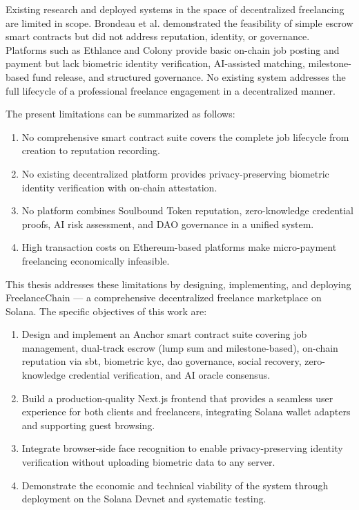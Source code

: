 Existing research and deployed systems in the space of decentralized freelancing are limited in scope. Brondeau et al. \cite{delmolino2016step} demonstrated the feasibility of simple escrow smart contracts but did not address reputation, identity, or governance. Platforms such as Ethlance and Colony provide basic on-chain job posting and payment but lack biometric identity verification, AI-assisted matching, milestone-based fund release, and structured governance. No existing system addresses the full lifecycle of a professional freelance engagement in a decentralized manner.

The present limitations can be summarized as follows:
\begin{enumerate}
    \item No comprehensive smart contract suite covers the complete job lifecycle from creation to reputation recording.
    \item No existing decentralized platform provides privacy-preserving biometric identity verification with on-chain attestation.
    \item No platform combines Soulbound Token reputation, zero-knowledge credential proofs, AI risk assessment, and DAO governance in a unified system.
    \item High transaction costs on Ethereum-based platforms make micro-payment freelancing economically infeasible.
\end{enumerate}

This thesis addresses these limitations by designing, implementing, and deploying FreelanceChain --- a comprehensive decentralized freelance marketplace on Solana. The specific objectives of this work are:

\begin{enumerate}
    \item Design and implement an Anchor smart contract suite covering job management, dual-track escrow (lump sum and milestone-based), on-chain reputation via \gls{sbt}, biometric \gls{kyc}, \gls{dao} governance, social recovery, zero-knowledge credential verification, and AI oracle consensus.
    \item Build a production-quality Next.js frontend that provides a seamless user experience for both clients and freelancers, integrating Solana wallet adapters and supporting guest browsing.
    \item Integrate browser-side face recognition to enable privacy-preserving identity verification without uploading biometric data to any server.
    \item Demonstrate the economic and technical viability of the system through deployment on the Solana Devnet and systematic testing.
\end{enumerate}

